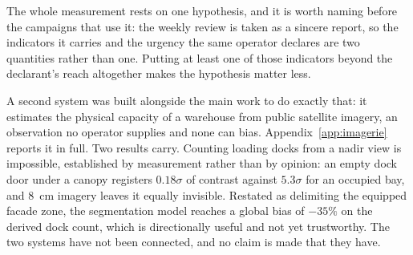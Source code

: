 The whole measurement rests on one hypothesis, and it is worth naming before the campaigns
that use it: the weekly review is taken as a sincere report, so the indicators it carries and
the urgency the same operator declares are two quantities rather than one. Putting at least
one of those indicators beyond the declarant's reach altogether makes the hypothesis matter
less.

A second system was built alongside the main work to do exactly that: it estimates the
physical capacity of a warehouse from public satellite imagery, an observation no operator
supplies and none can bias. Appendix~\ref{app:imagerie} reports it in full. Two
results carry. Counting loading docks from a nadir view is impossible, established by
measurement rather than by opinion: an empty dock door under a canopy registers $0.18\sigma$
of contrast against $5.3\sigma$ for an occupied bay, and 8~cm imagery leaves it equally
invisible. Restated as delimiting the equipped facade zone, the segmentation model reaches a
global bias of $-35\%$ on the derived dock count, which is directionally useful and not yet
trustworthy. The two systems have not been connected, and no claim is made that they have.

